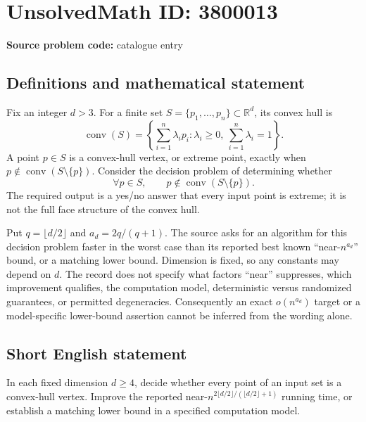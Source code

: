 \documentclass[11pt]{article}
\newcommand{\R}{\mathbb{R}}
\begin{document}
\section*{UnsolvedMath ID: 3800013}
\textbf{Source problem code:} catalogue entry
\subsection{Definitions and mathematical statement}
Fix an integer $d>3$. For a finite set $S=\{p_1,\ldots,p_n\}\subset\R^d$, its convex hull is
\[
\operatorname{conv}(S)=\left\{\sum_{i=1}^n\lambda_i p_i:\lambda_i\geq0,\ \sum_{i=1}^n\lambda_i=1\right\}.
\]
A point $p\in S$ is a convex-hull vertex, or extreme point, exactly when $p\notin\operatorname{conv}(S\setminus\{p\})$. Consider the decision problem of determining whether
\[
\forall p\in S,\qquad p\notin\operatorname{conv}(S\setminus\{p\}).
\]
The required output is a yes/no answer that every input point is extreme; it is not the full face structure of the convex hull.

Put $q=\lfloor d/2\rfloor$ and $a_d=2q/(q+1)$. The source asks for an algorithm for this decision problem faster in the worst case than its reported best known ``near-$n^{a_d}$'' bound, or a matching lower bound. Dimension is fixed, so any constants may depend on $d$. The record does not specify what factors ``near'' suppresses, which improvement qualifies, the computation model, deterministic versus randomized guarantees, or permitted degeneracies. Consequently an exact $o(n^{a_d})$ target or a model-specific lower-bound assertion cannot be inferred from the wording alone.
\subsection{Short English statement}
In each fixed dimension $d\geq4$, decide whether every point of an input set is a convex-hull vertex. Improve the reported near-$n^{2\lfloor d/2\rfloor/(\lfloor d/2\rfloor+1)}$ running time, or establish a matching lower bound in a specified computation model.
\end{document}
